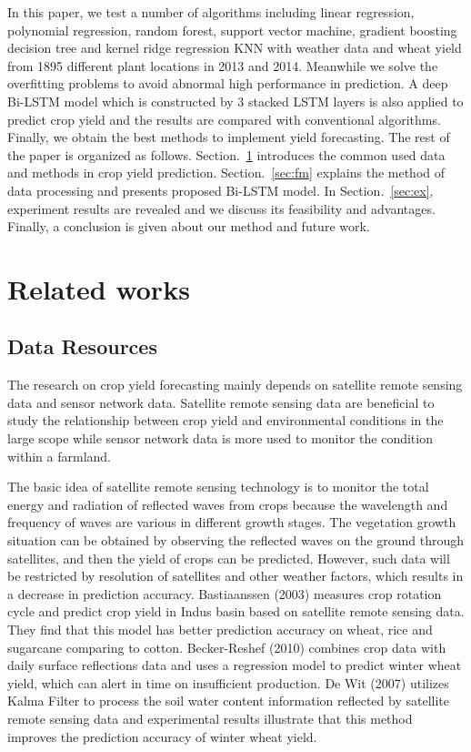 \documentclass[conference]{IEEEtran}
\begin{document}

  In this paper, we test a number of algorithms including linear regression, polynomial regression, random forest, support vector machine, gradient boosting decision tree and kernel ridge regression KNN with weather data and wheat yield from 1895 different plant locations in 2013 and 2014. Meanwhile we solve the overﬁtting problems to avoid abnormal high performance in prediction. A deep Bi-LSTM model which is constructed by 3 stacked LSTM layers is also applied to predict crop yield and the results are compared with conventional algorithms. Finally, we obtain the best methods to implement yield forecasting. The rest of the paper is organized as follows. Section.~\ref{sec:RW} introduces the common used data and methods in crop yield prediction. Section.~\ref{sec:fm} explains the method of data processing and presents proposed Bi-LSTM model. In Section.~\ref{sec:ex}, experiment results are revealed and we discuss its feasibility and advantages. Finally, a conclusion is given about our method and future work.

\section{Related works} \label{sec:RW}

  \subsection{Data Resources}

    The research on crop yield forecasting mainly depends on satellite remote sensing data and sensor network data. Satellite remote sensing data are beneficial to study the relationship between crop yield and environmental conditions in the large scope while sensor network data is more used to monitor the condition within a farmland. 

    The basic idea of satellite remote sensing technology is to monitor the total energy and radiation of reflected waves from crops because the wavelength and frequency of waves are various in different growth stages. The vegetation growth situation can be obtained by observing the reﬂected waves on the ground through satellites, and then the yield of crops can be predicted. However, such data will be restricted by resolution of satellites and other weather factors, which results in a decrease in prediction accuracy. Bastiaanssen (2003) \cite{Bastiaanssen2003} measures crop rotation cycle and predict crop yield in Indus basin based on satellite remote sensing data. They ﬁnd that this model has better prediction accuracy on wheat, rice and sugarcane comparing to cotton. Becker-Reshef (2010)\cite{Becker-Reshef2010} combines crop data with daily surface reﬂections data and uses a regression model to predict winter wheat yield, which can alert in time on insufficient production. De Wit (2007) \cite{DeWit2007} utilizes Kalma Filter to process the soil water content information reﬂected by satellite remote sensing data and experimental results illustrate that this method improves the prediction accuracy of winter wheat yield.
\end{document}
